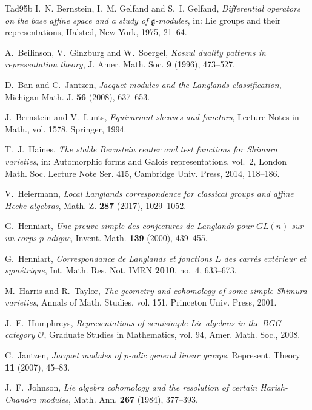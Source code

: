 \documentclass[a4paper,12pt,leqno]{amsart}
\theoremstyle{plain}
\theoremstyle{definition}
\begin{document}
\begin{thebibliography}{Tad95b}
 I.~N. Bernstein, I.~M. Gelfand and S.~I. Gelfand, \emph{Differential operators on
the base affine space and a study of $\mathfrak{g}$-modules}, in: Lie groups and their representations,
Halsted, New York, 1975, 21--64.

 A.~Beilinson, V.~Ginzburg and W.~Soergel, \emph{Koszul duality patterns in
representation theory}, J. Amer. Math. Soc. \textbf{9} (1996), 473--527.

 D.~Ban and C.~Jantzen, \emph{Jacquet modules and the Langlands classification},
Michigan Math. J. \textbf{56} (2008), 637--653.

 J.~Bernstein and V.~Lunts, \emph{Equivariant sheaves and functors}, Lecture Notes
in Math., vol. 1578, Springer, 1994.

 T.~J.~Haines, \emph{The stable Bernstein center and test functions for Shimura
varieties}, in: Automorphic forms and Galois representations, vol.~2, London Math. Soc. Lecture Note
Ser. 415, Cambridge Univ. Press, 2014, 118--186.

 V.~Heiermann, \emph{Local Langlands correspondence for classical groups and
affine Hecke algebras}, Math. Z. \textbf{287} (2017), 1029--1052.

 G.~Henniart, \emph{Une preuve simple des conjectures de Langlands pour $GL(n)$ sur
un corps $p$-adique}, Invent. Math. \textbf{139} (2000), 439--455.

 G.~Henniart, \emph{Correspondance de Langlands et fonctions $L$ des carr\'es
ext\'erieur et sym\'etrique}, Int. Math. Res. Not. IMRN \textbf{2010}, no.~4, 633--673.

 M.~Harris and R.~Taylor, \emph{The geometry and cohomology of some simple Shimura
varieties}, Annals of Math. Studies, vol. 151, Princeton Univ. Press, 2001.

 J.~E.~Humphreys, \emph{Representations of semisimple Lie algebras in the BGG
category $\mathcal{O}$}, Graduate Studies in Mathematics, vol. 94, Amer. Math. Soc., 2008.

 C.~Jantzen, \emph{Jacquet modules of $p$-adic general linear groups},
Represent. Theory \textbf{11} (2007), 45--83.

 J.~F.~Johnson, \emph{Lie algebra cohomology and the resolution of certain
Harish-Chandra modules}, Math. Ann. \textbf{267} (1984), 377--393.


\end{thebibliography}
\end{document}
